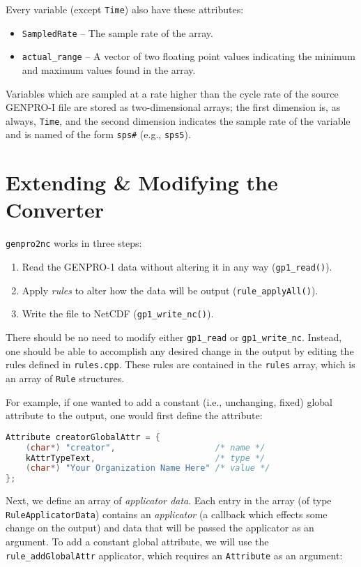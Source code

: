 \documentclass{report}
\begin{document}
Every variable (except \texttt{Time}) also have these attributes:
\begin{itemize}[noitemsep]
	\item \texttt{SampledRate} -- The sample rate of the array.
	\item \texttt{actual\_range} -- A vector of two floating point values indicating the minimum and maximum values found in the array.
\end{itemize}

Variables which are sampled at a rate higher than the cycle rate of the source GENPRO-I file are stored as two-dimensional arrays; the first dimension is, as always, \texttt{Time}, and the second dimension indicates the sample rate of the variable and is named of the form \texttt{sps\#} (e.g., \texttt{sps5}).

\section{Extending \& Modifying the Converter} \label{Sec.Extending}

\texttt{genpro2nc} works in three steps:
\begin{enumerate}[noitemsep]
	\item Read the GENPRO-1 data without altering it in any way (\texttt{gp1\_read()}).
	\item Apply \textit{rules} to alter how the data will be output (\texttt{rule\_applyAll()}).
	\item Write the file to NetCDF (\texttt{gp1\_write\_nc()}).
\end{enumerate}

There should be no need to modify either \texttt{gp1\_read} or \texttt{gp1\_write\_nc}. Instead, one should be able to accomplish any desired change in the output by editing the rules defined in \texttt{rules.cpp}. These rules are contained in the \texttt{rules} array, which is an array of \texttt{Rule} structures.

For example, if one wanted to add a constant (i.e., unchanging, fixed) global attribute to the output, one would first define the attribute:
\begin{lstlisting}[language=c]
Attribute creatorGlobalAttr = {
	(char*) "creator",                    /* name */
	kAttrTypeText,                        /* type */
	(char*) "Your Organization Name Here" /* value */
};
\end{lstlisting}

Next, we define an array of \textit{applicator data}. Each entry in the array (of type \texttt{RuleApplicatorData}) contains an \textit{applicator} (a callback which effects some change on the output) and data that will be passed the applicator as an argument. To add a constant global attribute, we will use the \texttt{rule\_addGlobalAttr} applicator, which requires an \texttt{Attribute} as an argument:
\end{document}
